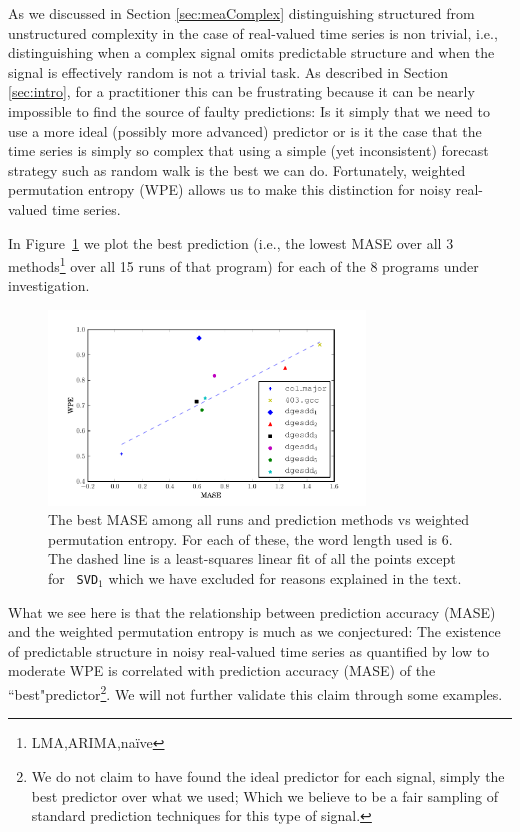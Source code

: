 \documentclass{article}
\begin{document}

As we discussed in Section \ref{sec:meaComplex} distinguishing structured from unstructured complexity in the case of real-valued time series is non trivial, i.e., distinguishing when a complex signal omits predictable structure and when the signal is effectively random is not a trivial task. As described in Section \ref{sec:intro}, for a practitioner this can be frustrating because it can be nearly impossible to find the source of faulty predictions: Is it simply that we need to use a more ideal (possibly more advanced) predictor or is it the case that the time series is simply so complex that using a simple (yet inconsistent) forecast strategy such as random walk is the best we can do. Fortunately, weighted permutation entropy (WPE) allows us to make this distinction for noisy real-valued time series. 

In Figure~\ref{fig:pred_vs_wpe} we plot the best prediction (i.e., the lowest MASE over all 3 methods\footnote{LMA,ARIMA,na\"ive} over all 15 runs of that program) for each of the 8 programs under investigation. 
\begin{figure}[htbp]
  \centering
  \includegraphics[width=0.75\textwidth]{figs/prediction_vs_entropy}
  \caption{The best MASE among all runs and prediction methods vs weighted
  permutation entropy. For each of these, the word length used is $6$. The
  dashed line is a least-squares linear fit of all the points except for {\tt
  SVD$_1$} which we have excluded for reasons explained in the text.}
  \label{fig:pred_vs_wpe}
\end{figure}
What we see here is that the relationship between prediction accuracy (MASE) and the weighted permutation entropy is much as we conjectured: The existence of predictable structure in noisy real-valued time series as quantified by low to moderate WPE  is correlated with prediction accuracy (MASE) of the ``best"predictor\footnote{We do not claim to have found the ideal predictor for each signal, simply the best predictor over what we used; Which we believe to be a fair sampling of standard prediction techniques for this type of signal.}. We will not further validate this claim through some examples. 
\end{document}
